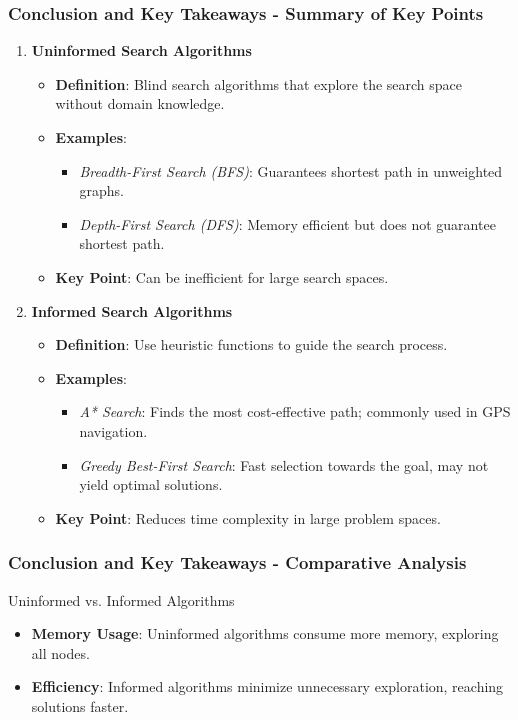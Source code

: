 \documentclass[aspectratio=169]{beamer}
\begin{document}
\begin{frame}[fragile]
    \frametitle{Conclusion and Key Takeaways - Summary of Key Points}
    
    \begin{enumerate}
        \item \textbf{Uninformed Search Algorithms}
            \begin{itemize}
                \item \textbf{Definition}: Blind search algorithms that explore the search space without domain knowledge.
                \item \textbf{Examples}:
                \begin{itemize}
                    \item \textit{Breadth-First Search (BFS)}: Guarantees shortest path in unweighted graphs.
                    \item \textit{Depth-First Search (DFS)}: Memory efficient but does not guarantee shortest path.
                \end{itemize}
                \item \textbf{Key Point}: Can be inefficient for large search spaces.
            \end{itemize}

        \item \textbf{Informed Search Algorithms}
            \begin{itemize}
                \item \textbf{Definition}: Use heuristic functions to guide the search process.
                \item \textbf{Examples}:
                \begin{itemize}
                    \item \textit{A* Search}: Finds the most cost-effective path; commonly used in GPS navigation.
                    \item \textit{Greedy Best-First Search}: Fast selection towards the goal, may not yield optimal solutions.
                \end{itemize}
                \item \textbf{Key Point}: Reduces time complexity in large problem spaces.
            \end{itemize}
    \end{enumerate}
\end{frame}

\begin{frame}[fragile]
    \frametitle{Conclusion and Key Takeaways - Comparative Analysis}
    
    \begin{block}{Uninformed vs. Informed Algorithms}
        \begin{itemize}
            \item \textbf{Memory Usage}: Uninformed algorithms consume more memory, exploring all nodes.
            \item \textbf{Efficiency}: Informed algorithms minimize unnecessary exploration, reaching solutions faster.
        \end{itemize}
    \end{block}
\end{frame}
\end{document}
